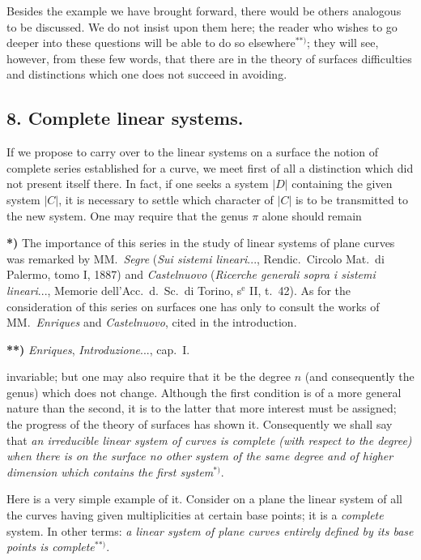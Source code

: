 \documentclass{article}
\begin{document}
Besides the example we have brought forward, there would be others analogous to be discussed. We do not insist upon them here; the reader who wishes to go deeper into these questions will be able to do so elsewhere${}^{**)}$; they will see, however, from these few words, that there are in the theory of surfaces difficulties and distinctions which one does not succeed in avoiding.

\subsection*{8. Complete linear systems.}

If we propose to carry over to the linear systems on a surface the notion of complete series established for a curve, we meet first of all a distinction which did not present itself there. In fact, if one seeks a system $|D|$ containing the given system $|C|$, it is necessary to settle which character of $|C|$ is to be transmitted to the new system. One may require that the genus $\pi$ alone should remain

\textbf{*)} The importance of this series in the study of linear systems of plane curves was remarked by MM.\ \emph{Segre} (\emph{Sui sistemi lineari}..., Rendic.\ Circolo Mat.\ di Palermo, tomo I, 1887) and \emph{Castelnuovo} (\emph{Ricerche generali sopra i sistemi lineari}..., Memorie dell'Acc.\ d.\ Sc.\ di Torino, s${}^{\text{e}}$ II, t.\ 42). As for the consideration of this series on surfaces one has only to consult the works of MM.\ \emph{Enriques} and \emph{Castelnuovo}, cited in the introduction.

\textbf{**)} \emph{Enriques}, \emph{Introduzione}..., cap.\ I.

invariable; but one may also require that it be the degree $n$ (and consequently the genus) which does not change. Although the first condition is of a more general nature than the second, it is to the latter that more interest must be assigned; the progress of the theory of surfaces has shown it. Consequently we shall say that \emph{an irreducible linear system of curves is complete (with respect to the degree) when there is on the surface no other system of the same degree and of higher dimension which contains the first system}${}^{*)}$.

Here is a very simple example of it. Consider on a plane the linear system of all the curves having given multiplicities at certain base points; it is a \emph{complete} system. In other terms: \emph{a linear system of plane curves entirely defined by its base points is complete}${}^{**)}$.
\end{document}
